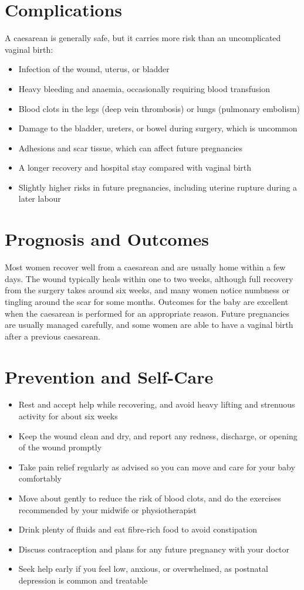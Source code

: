 \section*{Complications}
A caesarean is generally safe, but it carries more risk than an uncomplicated vaginal birth:
\begin{itemize}
    \item Infection of the wound, uterus, or bladder
    \item Heavy bleeding and anaemia, occasionally requiring blood transfusion
    \item Blood clots in the legs (deep vein thrombosis) or lungs (pulmonary embolism)
    \item Damage to the bladder, ureters, or bowel during surgery, which is uncommon
    \item Adhesions and scar tissue, which can affect future pregnancies
    \item A longer recovery and hospital stay compared with vaginal birth
    \item Slightly higher risks in future pregnancies, including uterine rupture during a later labour
\end{itemize}

\section*{Prognosis and Outcomes}
Most women recover well from a caesarean and are usually home within a few days. The wound typically heals within one to two weeks, although full recovery from the surgery takes around six weeks, and many women notice numbness or tingling around the scar for some months. Outcomes for the baby are excellent when the caesarean is performed for an appropriate reason. Future pregnancies are usually managed carefully, and some women are able to have a vaginal birth after a previous caesarean.

\section*{Prevention and Self-Care}
\begin{itemize}
    \item Rest and accept help while recovering, and avoid heavy lifting and strenuous activity for about six weeks
    \item Keep the wound clean and dry, and report any redness, discharge, or opening of the wound promptly
    \item Take pain relief regularly as advised so you can move and care for your baby comfortably
    \item Move about gently to reduce the risk of blood clots, and do the exercises recommended by your midwife or physiotherapist
    \item Drink plenty of fluids and eat fibre-rich food to avoid constipation
    \item Discuss contraception and plans for any future pregnancy with your doctor
    \item Seek help early if you feel low, anxious, or overwhelmed, as postnatal depression is common and treatable
\end{itemize}

